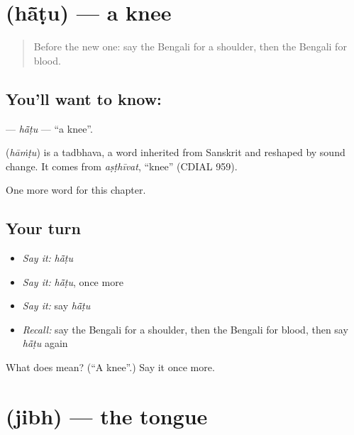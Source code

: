 \section[\texorpdfstring{\bn{হাঁটু} (hā̃ṭu)}{হাঁটু (hā̃ṭu)}]{ (hā̃ṭu) — a knee}

\label{lesson:BN-C43-hatu}



\begin{quote}
Before the new one: say the Bengali for a shoulder, then the Bengali for blood.
\end{quote}

\subsection*{You'll want to know: }
\textbf{} — \emph{hā̃ṭu} — \textquotedblleft{}a knee\textquotedblright{}.

\begin{cousinweb}
\textbf{} (\emph{hāṁṭu}) is a tadbhava, a word inherited from Sanskrit and reshaped by sound change. It comes from \emph{aṣṭhīvat}, \textquotedblleft{}knee\textquotedblright{} (CDIAL 959).
\end{cousinweb}

\begin{grammarlens}[title={What you've built}]
One more word for this chapter.
\end{grammarlens}

\subsection*{Your turn}
\begin{itemize}
\raggedright
  \item \emph{Say it:} \emph{hā̃ṭu}
  \item \emph{Say it:} \emph{hā̃ṭu}, once more
  \item \emph{Say it:} say \emph{hā̃ṭu}
  \item \emph{Recall:} say the Bengali for a shoulder, then the Bengali for blood, then say \emph{hā̃ṭu} again
\end{itemize}

\begin{tcolorbox}[breakable,colback=teal!4,colframe=teal!35!black,title={Before you move on}]
What does  mean? (\textquotedblleft{}A knee\textquotedblright{}.) Say it once more.
\end{tcolorbox}
\section[\texorpdfstring{\bn{জিভ} (jibh)}{জিভ (jibh)}]{ (jibh) — the tongue}

